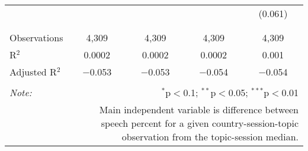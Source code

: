 \begin{table}[!htbp]
\begin{tabular}{@{\extracolsep{5pt}}lcccc}
  &  &  &  & (0.061) \\ 
  & & & & \\ 
\hline \\[-1.8ex] 
Observations & 4,309 & 4,309 & 4,309 & 4,309 \\ 
R$^{2}$ & 0.0002 & 0.0002 & 0.0002 & 0.001 \\ 
Adjusted R$^{2}$ & $-$0.053 & $-$0.053 & $-$0.054 & $-$0.054 \\ 
\hline 
\hline \\[-1.8ex] 
\textit{Note:}  & \multicolumn{4}{r}{$^{*}$p$<$0.1; $^{**}$p$<$0.05; $^{***}$p$<$0.01} \\ 
 & \multicolumn{4}{r}{Main independent variable is difference between speech percent for a given country-session-topic observation from the topic-session median.} \\ 
\end{tabular} 
\end{table} 
